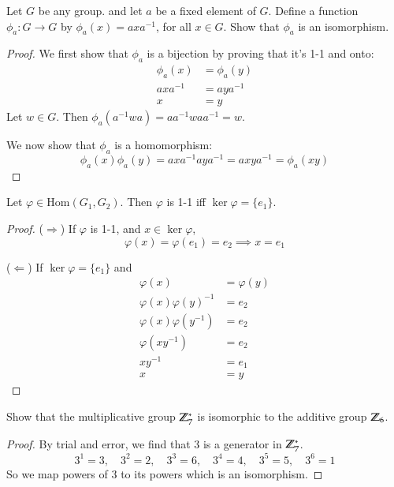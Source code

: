 \exercise
Let $G$ be any group. and let $a$ be a fixed element of $G$. Define a function $\phi_a: G\to G$ by $\phi_a(x)=axa^{-1}$, for all $x\in G$. Show that $\phi_a$ is an isomorphism. 
\begin{proof}
We first show that $\phi_a$ is a bijection by proving that it's 1-1 and onto:
\begin{align*}
	\phi_a(x) &= \phi_a(y) \\
	axa^{-1} &= aya^{-1} \\
	x &= y
\end{align*}
Let $w\in G$. Then $\phi_a(a^{-1}wa) = aa^{-1}waa^{-1} = w$. 

We now show that $\phi_a$ is a homomorphism: 
\[\phi_a(x)\phi_a(y) = axa^{-1}aya^{-1} = axya^{-1} = \phi_a(xy)\]
\end{proof}

\begin{proposition}
Let $\varphi\in \mathrm{Hom}(G_1, G_2)$. Then $\varphi$ is 1-1 iff $\ker \varphi = \{e_1\}$.
\end{proposition}
\begin{proof}
($\Rightarrow$) If $\varphi$ is 1-1, and $x\in \ker \varphi$, 
\[\varphi(x) = \varphi(e_1)=e_2 \implies x=e_1\]	

($\Leftarrow$) If $\ker \varphi = \{e_1\}$ and
\begin{align*}
\varphi(x) &= \varphi(y) \\
\varphi(x)\varphi(y)^{-1} &= e_2 \\
	\varphi(x)\varphi(y^{-1}) &= e_2 \\
	\varphi(xy^{-1}) &= e_2 \\
	xy^{-1} &= e_1 \\
	x &= y
\end{align*}
\end{proof}

\exercise Show that the multiplicative group $\mathbb{Z}_7^*$ is isomorphic to the additive group $\mathbb{Z}_6$. 
\begin{proof}
By trial and error, we find that $3$ is a generator in $\mathbb{Z}_7^*$. 
\[3^1 = 3, \quad 3^2 = 2, \quad 3^3 = 6, \quad 3^4 = 4, \quad 3^5 = 5, \quad 3^6 = 1\]
So we map powers of $3$ to its powers which is an isomorphism. 
\end{proof}


